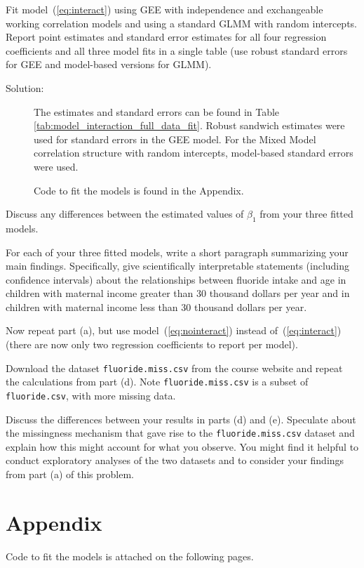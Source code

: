 \documentclass[11pt, letterpaper]{article}
\begin{document}
\begin{enumerate}[(a)]
{\em \item  Fit model~(\ref{eq:interact}) using GEE with independence and exchangeable working
correlation models and using a standard GLMM with random intercepts.  Report point estimates and standard error estimates 
for all four regression coefficients and all three model fits in a single table (use robust standard errors for GEE and model-based versions for GLMM).}

\begin{table}[ht]
  \scriptsize
  \centering
  
  \caption{Model fits of Equation \ref{eq:interact} with different correlation
    structures to the data in \texttt{fluoride.csv}.}
  \label{tab:model_interaction_full_data_fit}
\end{table}

\begin{description}
\item[Solution:] The estimates and standard errors can be found in Table
  \ref{tab:model_interaction_full_data_fit}. Robust sandwich estimates were used
  for standard errors in the GEE model. For the Mixed Model correlation
  structure with random intercepts, model-based standard errors were used.

  Code to fit the models is found in the Appendix.
\end{description}
{\em \item Discuss any differences between the estimated values of $\beta_1$ from your three fitted models.}
{\em \item For each of your three fitted models, write a short paragraph summarizing your main findings.  Specifically, give scientifically interpretable statements (including confidence intervals) about the relationships between fluoride intake and age
in children with maternal income greater than 30 thousand dollars per year and
in children with maternal income less than 30 thousand dollars per year.}
{\em \item Now repeat part (a), but use model~(\ref{eq:nointeract}) instead of~(\ref{eq:interact}) (there are now only two regression coefficients to report per model).}
{\em \item Download the dataset \texttt{fluoride.miss.csv} from the course website and repeat the calculations from part (d).  Note \texttt{fluoride.miss.csv} is a subset of \texttt{fluoride.csv}, with more missing data.}
{\em \item  Discuss the differences between your results in parts (d) and (e).  Speculate
about the missingness mechanism that gave rise to the \texttt{fluoride.miss.csv} dataset and 
explain how this might account for what you observe.  You might find it
helpful to conduct exploratory analyses of the two datasets and to consider your findings from part (a) of
this problem.
}

\end{enumerate}


\FloatBarrier

\section*{Appendix}

Code to fit the models is attached on the following pages.


\end{document}

